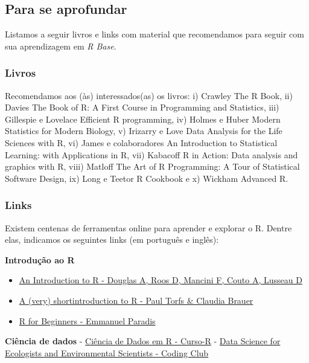 \documentclass[
]{article}
\providecommand{\tightlist}{%
  \setlength{\itemsep}{0pt}\setlength{\parskip}{0pt}}
\begin{document}
\hypertarget{para-se-aprofundar}{%
\subsection{Para se aprofundar}\label{para-se-aprofundar}}

Listamos a seguir livros e links com material que recomendamos para seguir com sua aprendizagem em \emph{R Base}.

\hypertarget{livros}{%
\subsubsection{Livros}\label{livros}}

Recomendamos aos (às) interessados(as) os livros: i) Crawley The R Book, ii) Davies The Book of R: A First Course in Programming and Statistics, iii) Gillespie e Lovelace Efficient R programming, iv) Holmes e Huber Modern Statistics for Modern Biology, v) Irizarry e Love Data Analysis for the Life Sciences with R, vi) James e colaboradores An Introduction to Statistical Learning: with Applications in R, vii) Kabacoff R in Action: Data analysis and graphics with R, viii) Matloff The Art of R Programming: A Tour of Statistical Software Design, ix) Long e Teetor R Cookbook e x) Wickham Advanced R.

\hypertarget{links}{%
\subsubsection{Links}\label{links}}

Existem centenas de ferramentas online para aprender e explorar o R. Dentre elas, indicamos os seguintes links (em português e inglês):

\textbf{Introdução ao R}

\begin{itemize}
\tightlist
\item
  \href{https://intro2r.com/}{An Introduction to R - Douglas A, Roos D, Mancini F, Couto A, Lusseau D}
\item
  \href{https://cran.r-project.org/doc/contrib/Torfs+Brauer-Short-R-Intro.pdf}{A (very) shortintroduction to R - Paul Torfs \& Claudia Brauer}
\item
  \href{https://rbasicsworkshop.weebly.com/uploads/1/8/6/0/18603232/paradis_2005_r-forbeginners.pdf}{R for Beginners - Emmanuel Paradis}
\end{itemize}

\textbf{Ciência de dados}
- \href{https://livro.curso-r.com/}{Ciência de Dados em R - Curso-R}
- \href{https://ourcodingclub.github.io/course}{Data Science for Ecologists and Environmental Scientists - Coding Club}
\end{document}
